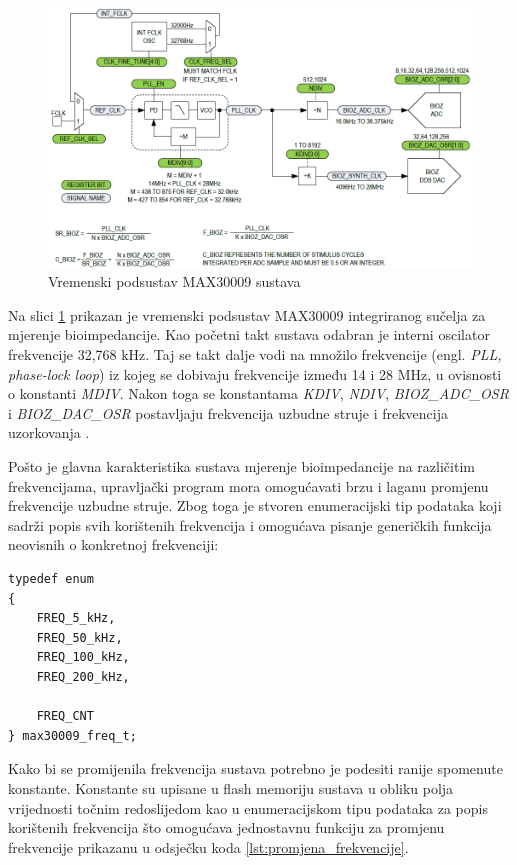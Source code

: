 \documentclass[../diplomski_rad.tex]{subfiles}
\begin{document}
\begin{figure}[htb]
    \centering
    \includegraphics[width=1\textwidth]{Figures/max30009_clock.png} 
    \caption{Vremenski podsustav MAX30009 sustava \cite{max30009_datasheet}}
    \label{slk:max_30009_clock}
\end{figure}

Na slici \ref{slk:max_30009_clock} prikazan je vremenski podsustav MAX30009 integriranog sučelja za mjerenje bioimpedancije.
Kao početni takt sustava odabran je interni oscilator frekvencije 32,768 kHz. Taj se takt dalje vodi na množilo frekvencije 
(engl. \textit{PLL, phase-lock loop}) iz kojeg se dobivaju frekvencije između 14 i 28 MHz, u ovisnosti o konstanti \textit{MDIV}. 
Nakon toga se konstantama \textit{KDIV}, \textit{NDIV}, 
\textit{BIOZ\_ADC\_OSR} i \textit{BIOZ\_DAC\_OSR} postavljaju frekvencija uzbudne struje i frekvencija uzorkovanja \cite{max30009_datasheet}.   

Pošto je glavna karakteristika sustava mjerenje bioimpedancije na različitim frekvencijama, upravljački program mora 
omogućavati brzu i laganu promjenu frekvencije uzbudne struje. Zbog toga je stvoren enumeracijski tip podataka koji 
sadrži popis svih korištenih frekvencija i omogućava pisanje generičkih funkcija neovisnih o konkretnoj frekvenciji: 
\begin{lstlisting}[label={lst:enumeracija_frekvencija},style=CStyle,caption={Enumeracijski tip podataka za odabir frekvencije rada},captionpos=b]
typedef enum
{
    FREQ_5_kHz,
    FREQ_50_kHz,
    FREQ_100_kHz,
    FREQ_200_kHz,
    
    FREQ_CNT
} max30009_freq_t;
\end{lstlisting} 

Kako bi se promijenila frekvencija sustava potrebno je podesiti ranije spomenute konstante. 
Konstante su upisane u flash memoriju sustava u obliku polja vrijednosti točnim redoslijedom kao 
u enumeracijskom tipu podataka za popis korištenih frekvencija što omogućava jednostavnu funkciju 
za promjenu frekvencije prikazanu u odsječku koda \ref{lst:promjena_frekvencije}. 
\end{document}
